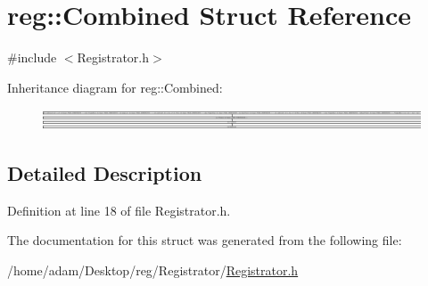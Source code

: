 \hypertarget{structreg_1_1_combined}{}\section{reg\+:\+:Combined Struct Reference}
\label{structreg_1_1_combined}


{\ttfamily \#include $<$Registrator.\+h$>$}

Inheritance diagram for reg\+:\+:Combined\+:\begin{figure}[H]
\begin{center}
\leavevmode
\includegraphics[height=0.625698cm]{structreg_1_1_combined}
\end{center}
\end{figure}


\subsection{Detailed Description}


Definition at line 18 of file Registrator.\+h.



The documentation for this struct was generated from the following file\+:\begin{DoxyCompactItemize}
\item 
/home/adam/\+Desktop/reg/\+Registrator/\hyperlink{_registrator_8h}{Registrator.\+h}\end{DoxyCompactItemize}
